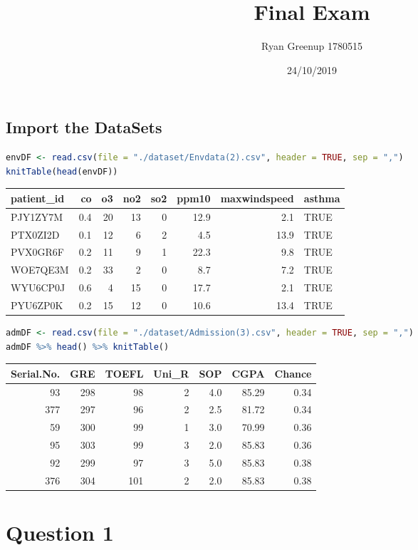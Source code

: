 \documentclass[
]{article}
\title{Final Exam}
\author{Ryan Greenup 1780515}
\date{24/10/2019}
\begin{document}
\maketitle

{
\setcounter{tocdepth}{3}
\tableofcontents
}
\hypertarget{import-the-datasets}{%
\subsection{Import the DataSets}\label{import-the-datasets}}

\begin{lstlisting}[language=R]
envDF <- read.csv(file = "./dataset/Envdata(2).csv", header = TRUE, sep = ",") 
knitTable(head(envDF))
\end{lstlisting}

\begin{longtable}[]{@{}lrrrrrrl@{}}
\toprule
patient\_id & co & o3 & no2 & so2 & ppm10 & maxwindspeed &
asthma\tabularnewline
\midrule
\endhead
PJY1ZY7M & 0.4 & 20 & 13 & 0 & 12.9 & 2.1 & TRUE\tabularnewline
PTX0ZI2D & 0.1 & 12 & 6 & 2 & 4.5 & 13.9 & TRUE\tabularnewline
PVX0GR6F & 0.2 & 11 & 9 & 1 & 22.3 & 9.8 & TRUE\tabularnewline
WOE7QE3M & 0.2 & 33 & 2 & 0 & 8.7 & 7.2 & TRUE\tabularnewline
WYU6CP0J & 0.6 & 4 & 15 & 0 & 17.7 & 2.1 & TRUE\tabularnewline
PYU6ZP0K & 0.2 & 15 & 12 & 0 & 10.6 & 13.4 & TRUE\tabularnewline
\bottomrule
\end{longtable}

\begin{lstlisting}[language=R]
admDF <- read.csv(file = "./dataset/Admission(3).csv", header = TRUE, sep = ",")
admDF %>% head() %>% knitTable()
\end{lstlisting}

\begin{longtable}[]{@{}rrrrrrr@{}}
\toprule
Serial.No. & GRE & TOEFL & Uni\_R & SOP & CGPA & Chance\tabularnewline
\midrule
\endhead
93 & 298 & 98 & 2 & 4.0 & 85.29 & 0.34\tabularnewline
377 & 297 & 96 & 2 & 2.5 & 81.72 & 0.34\tabularnewline
59 & 300 & 99 & 1 & 3.0 & 70.99 & 0.36\tabularnewline
95 & 303 & 99 & 3 & 2.0 & 85.83 & 0.36\tabularnewline
92 & 299 & 97 & 3 & 5.0 & 85.83 & 0.38\tabularnewline
376 & 304 & 101 & 2 & 2.0 & 85.83 & 0.38\tabularnewline
\bottomrule
\end{longtable}

\hypertarget{question-1}{%
\section{Question 1}\label{question-1}}
\end{document}
